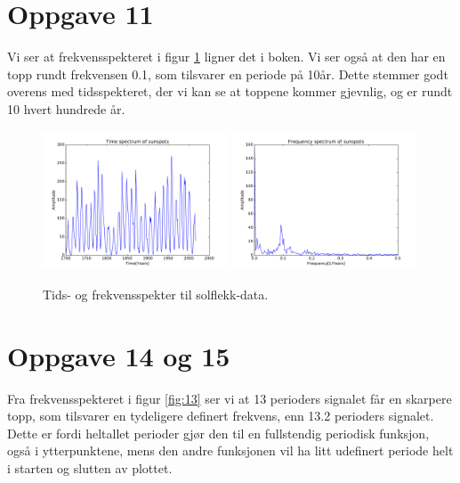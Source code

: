 \documentclass[12p,a4paper]{article}
\begin{document}
\section*{Oppgave 11}

Vi ser at frekvensspekteret i figur \ref{fig:sunspots} ligner det i boken. Vi ser også at den har en topp rundt frekvensen 0.1, som tilsvarer en periode på 10år. Dette stemmer godt overens med tidsspekteret, der vi kan se at toppene kommer gjevnlig, og er rundt 10 hvert hundrede år.

\begin{figure}[H]
\centering
\includegraphics[width=0.49\textwidth]{fig/suntimespec.pdf}
\includegraphics[width=0.49\textwidth]{fig/sunfreqspec.pdf}
\caption{Tids- og frekvensspekter til solflekk-data.}
\label{fig:sunspots}
\end{figure}




\section*{Oppgave 14 og 15}

Fra frekvensspekteret i figur \ref{fig:13} ser vi at 13 perioders signalet får en skarpere topp, som tilsvarer en tydeligere definert frekvens, enn 13.2 perioders signalet. Dette er fordi heltallet perioder gjør den til en fullstendig periodisk funksjon, også i ytterpunktene, mens den andre funksjonen vil ha litt udefinert periode helt i starten og slutten av plottet.
\end{document}
